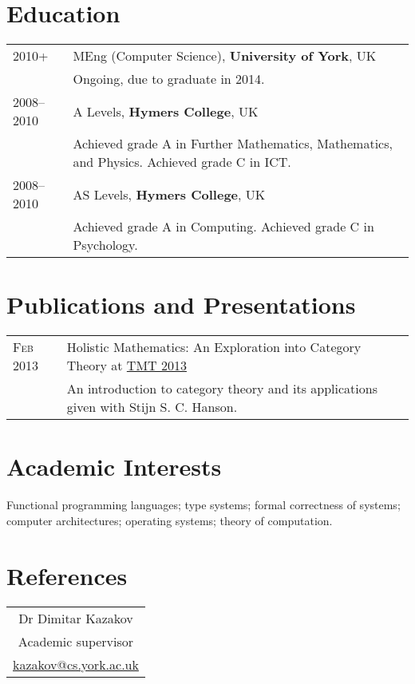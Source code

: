 \documentclass[a4paper,10pt]{article}
\newcommand{\schref}[2]{\href{#1}{\textsc{#2}}}
\newcommand{\mhref}[1]{\href{mailto:#1}{#1}}
\newenvironment{cvtable}{\begin{tabular}{x{2cm}|p{11.6cm}}}{\end{tabular}}
\newcommand{\rowhead}[1]{\textsc{#1} &}
\newcommand{\rowdetail}[1]{& \footnotesize{#1}}
\begin{document}
\section{Education}
\begin{cvtable}
  \rowhead{2010+}       MEng (Computer Science), \textbf{University of York}, UK\\
  \rowdetail{Ongoing, due to graduate in 2014.}\\

  \rowhead{2008--2010} A Levels, \textbf{Hymers College}, UK\\
  \rowdetail{Achieved grade A in Further Mathematics, Mathematics, and Physics. Achieved grade C in ICT.}\\

  \rowhead{2008--2010} AS Levels, \textbf{Hymers College}, UK\\
  \rowdetail{Achieved grade A in Computing. Achieved grade C in Psychology.}
\end{cvtable}

\section{Publications and Presentations}
\begin{cvtable}
  \rowhead{Feb 2013} Holistic Mathematics: An Exploration into Category Theory at \schref{http://mathsoc.cms.gre.ac.uk/tmt/}{TMT 2013}\\
  \rowdetail{An introduction to category theory and its applications given with Stijn S. C. Hanson.}
\end{cvtable}

\section{Academic Interests}
Functional programming languages; type systems; formal correctness of systems; computer architectures; operating systems; theory of computation.

\section{References}
\begin{tabular}{c}
  Dr Dimitar Kazakov\\
  Academic supervisor\\
  \mhref{kazakov@cs.york.ac.uk}\\
\end{tabular}
\end{document}
